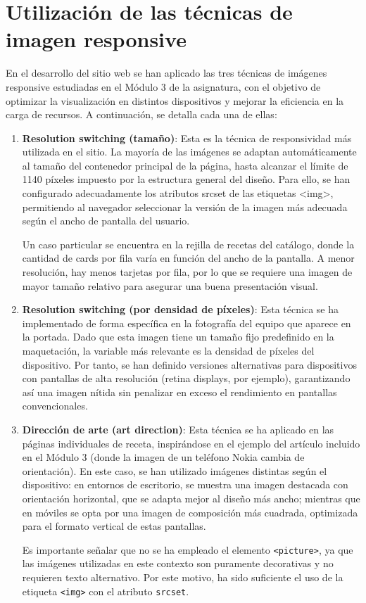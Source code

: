 \documentclass{article}
\begin{document}
\section{Utilización de las técnicas de imagen responsive}\label{sec:utilizacion-de-las-tecnicas-de-imagen-responsive}

En el desarrollo del sitio web se han aplicado las tres técnicas de imágenes responsive estudiadas en el Módulo 3 de la asignatura, con el objetivo de optimizar la visualización en distintos dispositivos y mejorar la eficiencia en la carga de recursos. A continuación, se detalla cada una de ellas:

\begin{enumerate}
    \item \textbf{Resolution switching (tamaño)}: Esta es la técnica de responsividad más utilizada en el sitio. La mayoría de las imágenes se adaptan automáticamente al tamaño del contenedor principal de la página, hasta alcanzar el límite de 1140 píxeles impuesto por la estructura general del diseño. Para ello, se han configurado adecuadamente los atributos srcset de las etiquetas <img>, permitiendo al navegador seleccionar la versión de la imagen más adecuada según el ancho de pantalla del usuario.

    Un caso particular se encuentra en la rejilla de recetas del catálogo, donde la cantidad de cards por fila varía en función del ancho de la pantalla. A menor resolución, hay menos tarjetas por fila, por lo que se requiere una imagen de mayor tamaño relativo para asegurar una buena presentación visual.

    \item \textbf{Resolution switching (por densidad de píxeles)}: Esta técnica se ha implementado de forma específica en la fotografía del equipo que aparece en la portada. Dado que esta imagen tiene un tamaño fijo predefinido en la maquetación, la variable más relevante es la densidad de píxeles del dispositivo. Por tanto, se han definido versiones alternativas para dispositivos con pantallas de alta resolución (retina displays, por ejemplo), garantizando así una imagen nítida sin penalizar en exceso el rendimiento en pantallas convencionales.

    \item \textbf{Dirección de arte (art direction)}: Esta técnica se ha aplicado en las páginas individuales de receta, inspirándose en el ejemplo del artículo incluido en el Módulo 3 (donde la imagen de un teléfono Nokia cambia de orientación). En este caso, se han utilizado imágenes distintas según el dispositivo: en entornos de escritorio, se muestra una imagen destacada con orientación horizontal, que se adapta mejor al diseño más ancho; mientras que en móviles se opta por una imagen de composición más cuadrada, optimizada para el formato vertical de estas pantallas.

    Es importante señalar que no se ha empleado el elemento \texttt{<picture>}, ya que las imágenes utilizadas en este contexto son puramente decorativas y no requieren texto alternativo. Por este motivo, ha sido suficiente el uso de la etiqueta \texttt{<img>} con el atributo \texttt{srcset}.
\end{enumerate}
\end{document}
